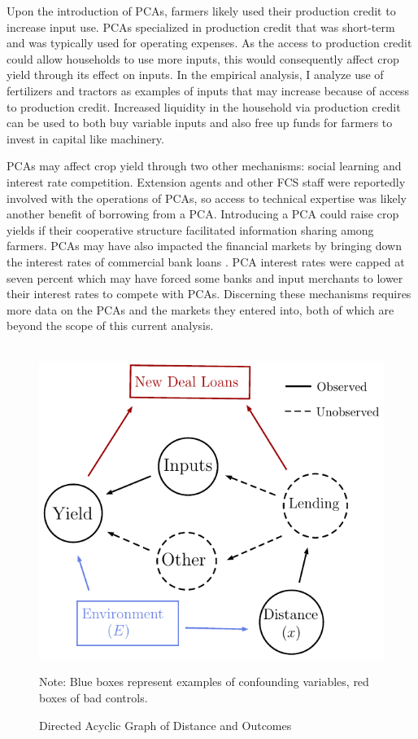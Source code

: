 \documentclass[12pt]{article}
\begin{document}
Upon the introduction of PCAs, farmers likely used their production credit to increase input use.
PCAs specialized in production credit that was short-term and was typically used for operating expenses.
As the access to production credit could allow households to use more inputs, this would consequently affect crop yield through its effect on inputs.
In the empirical analysis, I analyze use of fertilizers and tractors as examples of inputs that may increase because of access to production credit.
Increased liquidity in the household via production credit can be used to both buy variable inputs and also free up funds for farmers to invest in capital like machinery.

PCAs may affect crop yield through two other mechanisms: social learning and interest rate competition. 
Extension agents and other FCS staff were reportedly involved with the operations of PCAs, so access to technical expertise was likely another benefit of borrowing from a PCA. 
Introducing a PCA could raise crop yields if their cooperative structure facilitated information sharing among farmers.
PCAs may have also impacted the financial markets by bringing down the interest rates of commercial bank loans \citep{murray_agricultural_1941}.
PCA interest rates were capped at seven percent which may have forced some banks and input merchants to lower their interest rates to compete with PCAs.
Discerning these mechanisms requires more data on the PCAs and the markets they entered into, both of which are beyond the scope of this current analysis.

\begin{figure}
    \centering
    \caption{Directed Acyclic Graph of Distance and Outcomes}
    \label{DAG}
    \quad \\
\includegraphics[width=.5\textwidth]{DAG.pdf}

\footnotesize
Note: Blue boxes represent examples of confounding variables, red boxes of bad controls.
\end{figure}
\end{document}
